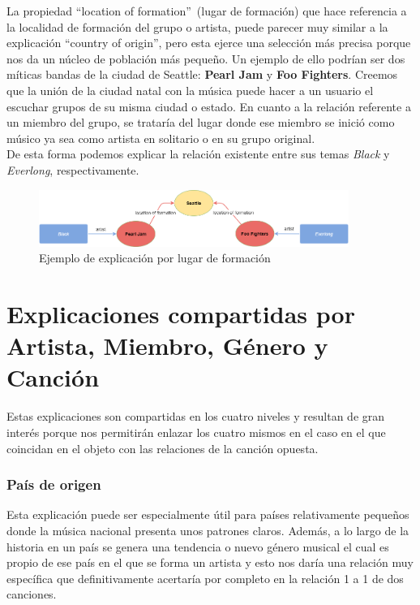 La propiedad ``location of formation''~(lugar de formación) que hace referencia a la localidad de formación del grupo o artista, puede parecer muy similar a la explicación ``country of origin'', pero esta ejerce una selección más precisa porque nos da un núcleo de población más pequeño. Un ejemplo de ello podrían ser dos míticas bandas de la ciudad de Seattle: \textbf{Pearl Jam} y \textbf{Foo Fighters}. Creemos que la unión de la ciudad natal con la música puede hacer a un usuario el escuchar grupos de su misma ciudad o estado. En cuanto a la relación referente a un miembro del grupo, se trataría del lugar donde ese miembro se inició como músico ya sea como artista en solitario o en su grupo original.\\

De esta forma podemos explicar la relación existente entre sus temas \textit{Black} y \textit{Everlong}, respectivamente.\\

\begin{figure}[h!]
	\centering
	\includegraphics[width = 0.9\textwidth]{Imagenes/Bitmap/LocationOfFormation.png}
	\caption{Ejemplo de explicación por lugar de formación}
	\label{fig:sampleImage}
\end{figure}

\section{Explicaciones compartidas por Artista, Miembro, Género y Canción}

Estas explicaciones son compartidas en los cuatro niveles y resultan de gran interés porque nos permitirán enlazar los cuatro mismos en el caso en el que coincidan en el objeto con las relaciones de la canción opuesta.\\

\subsubsection*{País de origen}

Esta explicación puede ser especialmente útil para países relativamente pequeños donde la música nacional presenta unos patrones claros. Además, a lo largo de la historia en un país se genera una tendencia o nuevo género musical el cual es propio de ese país en el que se forma un artista y esto nos daría una relación muy específica que definitivamente acertaría por completo en la relación 1 a 1 de dos canciones.\\

